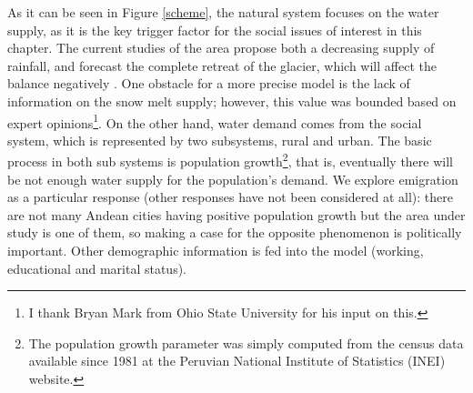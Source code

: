 \documentclass[doc,12pt,floatsintext]{apa7}
\begin{document}
As it can be seen in Figure \ref{scheme}, the natural system focuses on the water supply, as it is the key trigger factor for the social issues of interest in this chapter.  The current studies of the area propose both a decreasing supply of rainfall, and forecast the complete retreat of the glacier, which will affect the balance negatively \parencite{carlos_riesgos_2012,lopez-moreno_recent_2014}. One obstacle for a more precise model is the lack of information on the snow melt supply; however, this value was bounded based  on  expert opinions\footnote{I thank Bryan Mark from Ohio State University for his input on this.}.
% 
On the other hand, water demand comes from the social system, which is represented by two subsystems, rural and urban. The basic process in both sub systems is population growth\footnote{The population growth parameter was simply computed from the census data available since 1981 at the Peruvian National Institute of Statistics (INEI) website.}, that is, eventually there will be not enough water supply for the population's demand. We explore emigration as a particular response (other responses have not been considered at all): there are not many Andean cities having positive population growth but the area under study is one of them, so making a case for the opposite phenomenon is politically important. Other demographic information is fed into the model (working, educational and marital status).


% 
\end{document}
